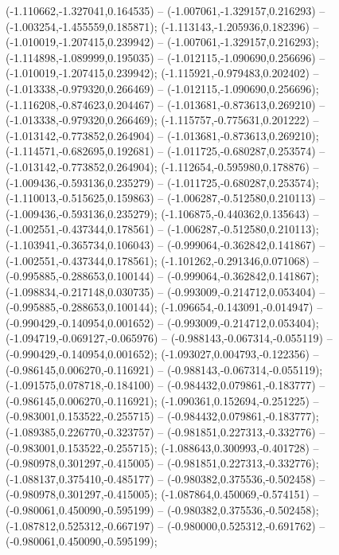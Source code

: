  (-1.110662,-1.327041,0.164535) -- (-1.007061,-1.329157,0.216293) -- (-1.003254,-1.455559,0.185871);
 (-1.113143,-1.205936,0.182396) -- (-1.010019,-1.207415,0.239942) -- (-1.007061,-1.329157,0.216293);
 (-1.114898,-1.089999,0.195035) -- (-1.012115,-1.090690,0.256696) -- (-1.010019,-1.207415,0.239942);
 (-1.115921,-0.979483,0.202402) -- (-1.013338,-0.979320,0.266469) -- (-1.012115,-1.090690,0.256696);
 (-1.116208,-0.874623,0.204467) -- (-1.013681,-0.873613,0.269210) -- (-1.013338,-0.979320,0.266469);
 (-1.115757,-0.775631,0.201222) -- (-1.013142,-0.773852,0.264904) -- (-1.013681,-0.873613,0.269210);
 (-1.114571,-0.682695,0.192681) -- (-1.011725,-0.680287,0.253574) -- (-1.013142,-0.773852,0.264904);
 (-1.112654,-0.595980,0.178876) -- (-1.009436,-0.593136,0.235279) -- (-1.011725,-0.680287,0.253574);
 (-1.110013,-0.515625,0.159863) -- (-1.006287,-0.512580,0.210113) -- (-1.009436,-0.593136,0.235279);
 (-1.106875,-0.440362,0.135643) -- (-1.002551,-0.437344,0.178561) -- (-1.006287,-0.512580,0.210113);
 (-1.103941,-0.365734,0.106043) -- (-0.999064,-0.362842,0.141867) -- (-1.002551,-0.437344,0.178561);
 (-1.101262,-0.291346,0.071068) -- (-0.995885,-0.288653,0.100144) -- (-0.999064,-0.362842,0.141867);
 (-1.098834,-0.217148,0.030735) -- (-0.993009,-0.214712,0.053404) -- (-0.995885,-0.288653,0.100144);
 (-1.096654,-0.143091,-0.014947) -- (-0.990429,-0.140954,0.001652) -- (-0.993009,-0.214712,0.053404);
 (-1.094719,-0.069127,-0.065976) -- (-0.988143,-0.067314,-0.055119) -- (-0.990429,-0.140954,0.001652);
 (-1.093027,0.004793,-0.122356) -- (-0.986145,0.006270,-0.116921) -- (-0.988143,-0.067314,-0.055119);
 (-1.091575,0.078718,-0.184100) -- (-0.984432,0.079861,-0.183777) -- (-0.986145,0.006270,-0.116921);
 (-1.090361,0.152694,-0.251225) -- (-0.983001,0.153522,-0.255715) -- (-0.984432,0.079861,-0.183777);
 (-1.089385,0.226770,-0.323757) -- (-0.981851,0.227313,-0.332776) -- (-0.983001,0.153522,-0.255715);
 (-1.088643,0.300993,-0.401728) -- (-0.980978,0.301297,-0.415005) -- (-0.981851,0.227313,-0.332776);
 (-1.088137,0.375410,-0.485177) -- (-0.980382,0.375536,-0.502458) -- (-0.980978,0.301297,-0.415005);
 (-1.087864,0.450069,-0.574151) -- (-0.980061,0.450090,-0.595199) -- (-0.980382,0.375536,-0.502458);
 (-1.087812,0.525312,-0.667197) -- (-0.980000,0.525312,-0.691762) -- (-0.980061,0.450090,-0.595199);
